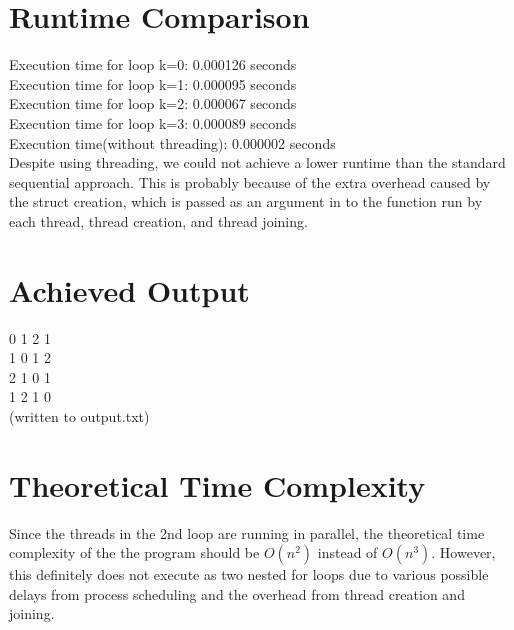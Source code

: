 \documentclass[11pt]{article}
\begin{document}
\section{Runtime Comparison}

Execution time for loop k=0: 0.000126 seconds\\
Execution time for loop k=1: 0.000095 seconds\\
Execution time for loop k=2: 0.000067 seconds\\
Execution time for loop k=3: 0.000089 seconds\\
Execution time(without threading): 0.000002 seconds\\

\noindent Despite using threading, we could not achieve a lower runtime than the standard sequential approach. This is probably because of the extra overhead caused by the struct creation, which is passed as an argument in to the function run by each thread, thread creation, and thread joining.

\pagebreak 
\section{Achieved Output}
0 1 2 1 \\
1 0 1 2 \\
2 1 0 1 \\
1 2 1 0 \\

\noindent (written to output.txt)

\section{Theoretical Time Complexity}
Since the threads in the 2nd loop are running in parallel, the theoretical time complexity of the the program should be $O(n^2)$ instead of $O(n^3)$. However, this definitely does not execute as two nested for loops due to various possible delays from process scheduling and the overhead from thread creation and joining.
\end{document}
